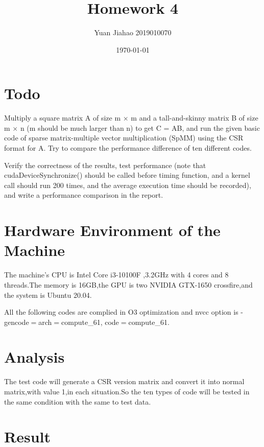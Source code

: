 \documentclass[11pt]{scrartcl} %
\title{	
	Homework 4
}
\author{Yuan Jiahao 2019010070} %
\date{\normalsize\today} %
\begin{document}
\maketitle %


\section{Todo}
Multiply a square matrix A of size m $\times$ m and a tall-and-skinny matrix B of size m $\times$ n
(m should be much larger than n) to get C = AB, and run the given basic code of sparse
matrix-multiple vector multiplication (SpMM) using the CSR format for A. Try to compare the
performance difference of ten different codes.

Verify the correctness of the results, test performance (note that cudaDeviceSynchronize()
should be called before timing function, and a kernel call should run 200 times, and the average
execution time should be recorded), and write a performance comparison in the report.
\section{Hardware Environment of the Machine }
The machine's CPU is Intel Core i3-10100F ,3.2GHz with 4 cores and 8 threads.The memory is 16GB,the GPU is two NVIDIA GTX-1650 crossfire,and the system is Ubuntu 20.04.

All the following codes are complied in O3 optimization and nvcc option is -gencode$=$arch$=$compute\_61, code$=$compute\_61.
\section{Analysis}
The test code will generate a CSR version matrix and convert it into normal matrix,with value 1,in each situation.So the ten types of code will be tested in the same condition with the same to test data.
\section{Result}
\end{document}
